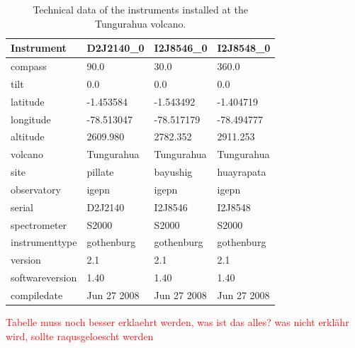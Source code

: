 \documentclass  [
  paper    = a4,
  BCOR     = 10mm,
  twoside,
  fontsize = 12pt,
  fleqn,
  toc      = bibnumbered,
  toc      = listofnumbered,
  numbers  = noendperiod,
  headings = normal,
  listof   = leveldown,
  version  = 3.03
]                                       {scrreprt}
\begin{document}
	\begin{table}[h]
		\centering
		\begin{tabular}{|p{4cm}|p{3cm}|p{3cm}|p{3cm}|}
			Instrument	&D2J2140\_0&I2J8546\_0& I2J8548\_0\\
			\toprule
		compass&90.0	&	30.0	&	360.0	\\
		tilt&0.0	&	0.0	&	0.0	\\
		latitude&-1.453584	&	-1.543492	&-1.404719	\\
		longitude&-78.513047	&-78.517179	&	-78.494777	\\
		altitude&2609.980	&	2782.352	&	2911.253	\\
		volcano&Tungurahua	&Tungurahua	&	Tungurahua	\\
		site&pillate	&	bayushig	&	huayrapata	\\
		observatory&igepn	&	igepn	&igepn	\\
		serial&D2J2140	&	I2J8546	&	I2J8548	\\
		spectrometer&S2000	&	S2000	&S2000	\\
		instrumenttype&gothenburg	&gothenburg	&gothenburg	\\
		version&2.1	&2.1	&	2.1	\\
		softwareversion&1.40	&	1.40	&	1.40	\\
		compiledate&Jun 27 2008	&Jun 27 2008	&Jun 27 2008	\\
			\bottomrule
		\end{tabular}
		\caption{Technical data of the instruments installed at the Tungurahua volcano.}
		\label{tab:TInstruments}
	\end{table}
\textcolor{red}{Tabelle muss noch besser erklaehrt werden, was ist das alles? was nicht erklähr wird, sollte raqusgeloescht werden}
\end{document}

